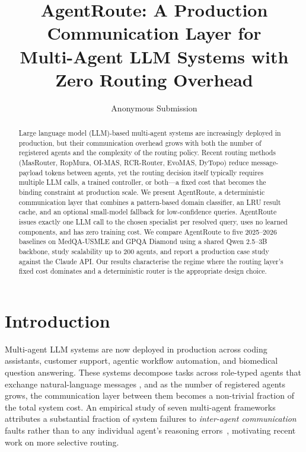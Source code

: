 \documentclass[11pt]{article}
\title{AgentRoute: A Production Communication Layer for \\
       Multi-Agent LLM Systems with Zero Routing Overhead}
\author{Anonymous Submission}
\begin{document}
\maketitle

\begin{abstract}
Large language model (LLM)-based multi-agent systems are increasingly deployed
in production, but their communication overhead grows with both the number of
registered agents and the complexity of the routing policy. Recent routing
methods (MasRouter, RopMura, OI-MAS, RCR-Router, EvoMAS, DyTopo) reduce
message-payload tokens between agents, yet the routing decision itself
typically requires multiple LLM calls, a trained controller, or both---a fixed
cost that becomes the binding constraint at production scale. We present
AgentRoute, a deterministic communication layer that combines a pattern-based
domain classifier, an LRU result cache, and an optional small-model fallback
for low-confidence queries. AgentRoute issues exactly one LLM call to the
chosen specialist per resolved query, uses no learned components, and has
zero training cost. We compare AgentRoute to five 2025--2026 baselines on
MedQA-USMLE and GPQA Diamond using a shared Qwen 2.5--3B backbone, study
scalability up to 200 agents, and report a production case study against the
Claude API. Our results characterise the regime where the routing layer's
fixed cost dominates and a deterministic router is the appropriate design
choice.
\end{abstract}

\section{Introduction}
\label{sec:intro}

Multi-agent LLM systems are now deployed in production across coding
assistants, customer support, agentic workflow automation, and biomedical
question answering. These systems decompose tasks across role-typed agents
that exchange natural-language messages \citep{wu2023autogen,hong2024metagpt,
li2023camel,qian2024chatdev,chen2024agentverse}, and as the number of
registered agents grows, the communication layer between them becomes a
non-trivial fraction of the total system cost. An empirical study of seven
multi-agent frameworks attributes a substantial fraction of system failures to
\emph{inter-agent communication} faults rather than to any individual agent's
reasoning errors~\citep{cemri2025why}, motivating recent work on more
selective routing.
\end{document}
